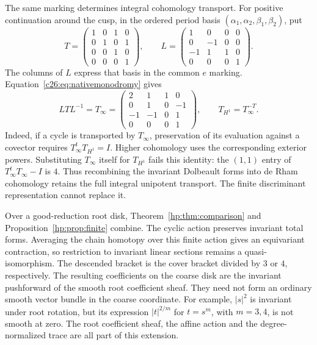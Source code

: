The same marking determines integral cohomology transport.
For positive continuation around the cusp, in the ordered
period basis $(\alpha_1,\alpha_2,\beta_1,\beta_2)$, put
\begin{equation}\label{hp:eq:cusp-matrices}
 T=\begin{pmatrix}1&0&1&0\\0&1&0&1\\0&0&1&0\\0&0&0&1\end{pmatrix},
 \qquad
 L=\begin{pmatrix}1&0&0&0\\0&-1&0&0\\-1&1&1&0\\0&0&0&1\end{pmatrix}.
\end{equation}
The columns of $L$ express that basis in the common $e$ marking.
Equation~\eqref{c26:eq:nativemonodromy} gives
\begin{equation}\label{hp:eq:dual-transport}
 LTL^{-1}=T_\infty=
 \begin{pmatrix}2&1&1&0\\0&1&0&-1\\-1&-1&0&1\\0&0&0&1\end{pmatrix},
 \qquad
 T_{H^1}=T_\infty^{-T}.
\end{equation}
Indeed, if a cycle is transported by $T_\infty$, preservation
of its evaluation against a covector requires
$T_\infty^tT_{H^1}=I$. Higher cohomology uses the corresponding
exterior powers. Substituting $T_\infty$ itself for $T_{H^1}$
fails this identity: the $(1,1)$ entry of
$T_\infty^tT_\infty-I$ is $4$.
Thus recombining the invariant Dolbeault forms into de Rham
cohomology retains the full integral unipotent transport. The
finite discriminant representation cannot replace it.

Over a good-reduction root disk, Theorem~\ref{hp:thm:comparison}
and Proposition~\ref{hp:prop:finite} combine. The cyclic action
preserves invariant total forms. Averaging the chain homotopy
over this finite action gives an equivariant contraction, so
restriction to invariant linear sections remains a
quasi-isomorphism. The descended bracket is the cover bracket
divided by $3$ or $4$, respectively.
The resulting coefficients on the coarse disk are the invariant
pushforward of the smooth root coefficient sheaf. They need
not form an ordinary smooth vector bundle in the coarse
coordinate. For example, $|s|^2$ is invariant under root
rotation, but its expression $|t|^{2/m}$ for $t=s^m$, with
$m=3,4$, is not smooth at zero. The root coefficient sheaf,
the affine action and the degree-normalized trace are all part
of this extension.

